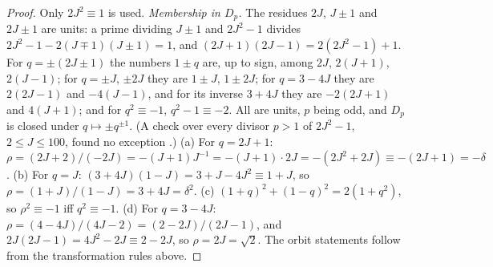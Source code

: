 \documentclass[11pt]{article}
\theoremstyle{definition}
\begin{document}
\begin{proof}
Only $2J^2\equiv1$ is used.  \emph{Membership in $D_p$.}  The residues
$2J$, $J\pm1$ and $2J\pm1$ are units: a prime dividing $J\pm1$ and
$2J^2-1$ divides $2J^2-1-2(J\mp1)(J\pm1)=1$, and
$(2J+1)(2J-1)=2(2J^2-1)+1$.  For $q=\pm(2J\pm1)$ the numbers $1\pm q$
are, up to sign, among $2J$, $2(J+1)$, $2(J-1)$; for $q=\pm J$, $\pm2J$
they are $1\pm J$, $1\pm2J$; for $q=3-4J$ they are $2(2J-1)$ and
$-4(J-1)$, and for its inverse $3+4J$ they are $-2(2J+1)$ and $4(J+1)$;
and for $q^2\equiv-1$, $q^2-1\equiv-2$.  All are units, $p$ being odd,
and $D_p$ is closed under $q\mapsto\pm q^{\pm1}$.  (A check over every
divisor $p>1$ of $2J^2-1$, $2\leq J\leq100$, found no exception
\cite{LCrecord}.)
(a) For $q=2J+1$:
$\rho=(2J+2)/(-2J)=-(J+1)J^{-1}=-(J+1)\cdot2J=-(2J^2+2J)\equiv-(2J+1)=-\delta$.
(b) For $q=J$: $(3+4J)(1-J)=3+J-4J^2\equiv1+J$, so
$\rho=(1+J)/(1-J)=3+4J=\delta^2$.
(c) $(1+q)^2+(1-q)^2=2(1+q^2)$, so $\rho^2\equiv-1$ iff $q^2\equiv-1$.
(d) For $q=3-4J$: $\rho=(4-4J)/(4J-2)=(2-2J)/(2J-1)$, and
$2J(2J-1)=4J^2-2J\equiv2-2J$, so $\rho=2J=\sqrt2$.  The orbit statements
follow from the transformation rules above.
\end{proof}
\end{document}

